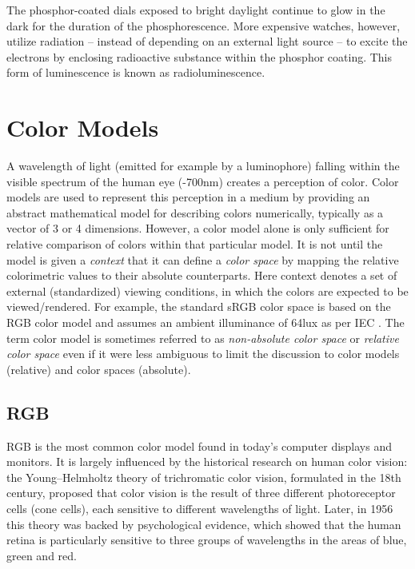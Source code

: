 \documentclass[thesis.tex]{subfiles}
\begin{document}
\noindent The phosphor-coated dials exposed to bright daylight continue to glow in the dark for the duration of the phosphorescence. More expensive watches, however, utilize radiation -- instead of depending on an external light source -- to excite the electrons by enclosing radioactive substance within the phosphor coating. This form of luminescence is known as radioluminescence.


\section{Color Models}
\label{section:rgbhsv}

A wavelength of light (emitted for example by a luminophore) falling within the visible spectrum of the human eye (-700nm) creates a perception of color. Color models are used to represent this perception in a medium by providing an abstract mathematical model for describing colors numerically, typically as a vector of 3 or 4 dimensions. However, a color model alone is only sufficient for relative comparison of colors within that particular model. It is not until the model is given a \textit{context} that it can define a \textit{color space} by mapping the relative colorimetric values to their absolute counterparts. Here context denotes a set of external (standardized) viewing conditions, in which the colors are expected to be viewed/rendered. For example, the standard sRGB color space is based on the RGB color model and assumes an ambient illuminance of 64lux as per IEC \cite{iec}. The term color model is sometimes referred to as \textit{non-absolute color space} or \textit{relative color space} even if it were less ambiguous to limit the discussion to color models (relative) and color spaces (absolute).

\subsection{RGB}
RGB is the most common color model found in today's computer displays and monitors. It is largely influenced by the historical research on human color vision: the Young–Helmholtz theory of trichromatic color vision, formulated in the 18th century, proposed that color vision is the result of three different photoreceptor cells (cone cells), each sensitive to different wavelengths of light. Later, in 1956 this theory was backed by psychological evidence, which showed that the human retina is particularly sensitive to three groups of wavelengths in the areas of blue, green and red. \cite{svaetichin}
\end{document}
